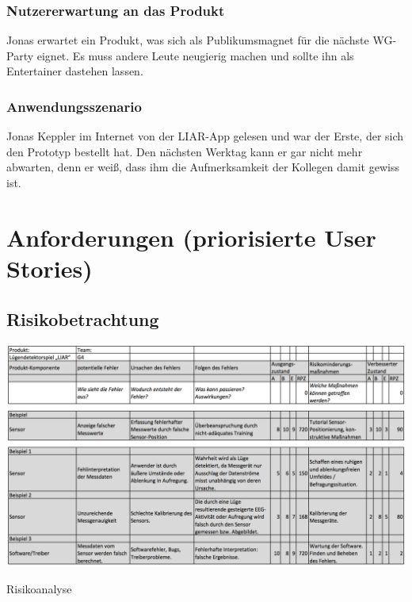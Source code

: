 \documentclass[10pt, a4paper, oneside, titlepage]{scrartcl} %
\begin{document}
	\subsubsection{Nutzererwartung an das Produkt}
	Jonas erwartet ein Produkt, was sich als Publikumsmagnet für die nächste WG-Party eignet. Es muss andere Leute neugierig machen und sollte ihn als Entertainer dastehen lassen. 
	\subsubsection{Anwendungsszenario}
	Jonas Keppler im Internet von der LIAR-App gelesen und war der Erste, der sich den Prototyp bestellt hat. Den nächsten Werktag kann er gar nicht mehr abwarten, denn er weiß, dass ihm die Aufmerksamkeit der Kollegen damit gewiss ist.
	
	\newpage
   	\section{Anforderungen (priorisierte User Stories)}
	
	\begin{landscape}
   	\section{Risikobetrachtung}
   	\begin{table}[h!]
		\begin{center}
			\includegraphics[scale=0.45]{Risikobetrachtung.png}
		\end{center}
		\caption[Risikoanalyse]{Risikoanalyse}
		\label{fig:risikoanalyse}
	\end{table}
	\end{landscape}
   
   \newpage
\end{document}
